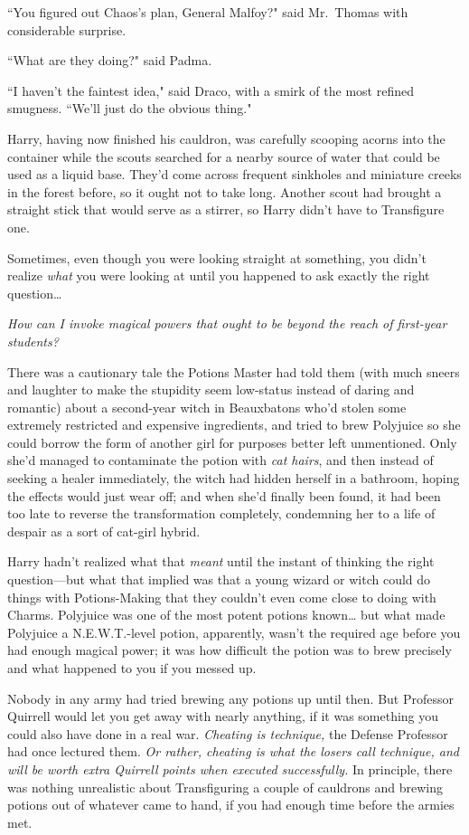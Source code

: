 ``You figured out Chaos's plan, General Malfoy?" said Mr.~Thomas with considerable surprise.

``What are they doing?" said Padma.

``I haven't the faintest idea," said Draco, with a smirk of the most refined smugness. ``We'll just do the obvious thing."

\later

Harry, having now finished his cauldron, was carefully scooping acorns into the container while the scouts searched for a nearby source of water that could be used as a liquid base. They'd come across frequent sinkholes and miniature creeks in the forest before, so it ought not to take long. Another scout had brought a straight stick that would serve as a stirrer, so Harry didn't have to Transfigure one.

Sometimes, even though you were looking straight at something, you didn't realize \emph{what} you were looking at until you happened to ask exactly the right question{\ldots}

\emph{How can I invoke magical powers that ought to be beyond the reach of first-year students?}

There was a cautionary tale the Potions Master had told them (with much sneers and laughter to make the stupidity seem low-status instead of daring and romantic) about a second-year witch in Beauxbatons who'd stolen some extremely restricted and expensive ingredients, and tried to brew Polyjuice so she could borrow the form of another girl for purposes better left unmentioned. Only she'd managed to contaminate the potion with \emph{cat hairs}, and then instead of seeking a healer immediately, the witch had hidden herself in a bathroom, hoping the effects would just wear off; and when she'd finally been found, it had been too late to reverse the transformation completely, condemning her to a life of despair as a sort of cat-girl hybrid.

Harry hadn't realized what that \emph{meant} until the instant of thinking the right question—but what that implied was that a young wizard or witch could do things with Potions-Making that they couldn't even come close to doing with Charms. Polyjuice was one of the most potent potions known{\ldots} but what made Polyjuice a N.E.W.T.-level potion, apparently, wasn't the required age before you had enough magical power; it was how difficult the potion was to brew precisely and what happened to you if you messed up.

Nobody in any army had tried brewing any potions up until then. But Professor Quirrell would let you get away with nearly anything, if it was something you could also have done in a real war. \emph{Cheating is technique,} the Defense Professor had once lectured them. \emph{Or rather, cheating is what the losers call technique, and will be worth extra Quirrell points when executed successfully.} In principle, there was nothing unrealistic about Transfiguring a couple of cauldrons and brewing potions out of whatever came to hand, if you had enough time before the armies met.

